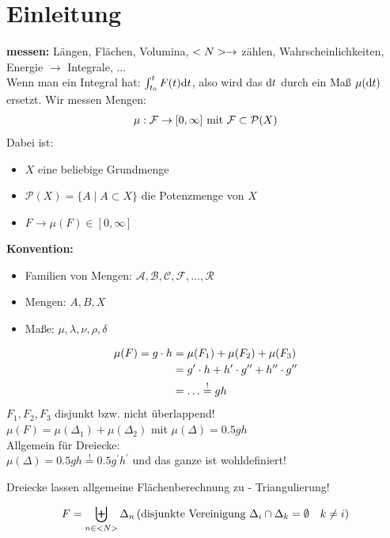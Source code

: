 \section{Einleitung}

\textbf{messen:} Längen, Flächen, Volumina, $<N> \to $ zählen, Wahrscheinlichkeiten, Energie $\to$ Integrale, ... \\
Wenn man ein Integral hat: $\int_{t_0}^{t}F(t)\mathrm{d} t$, also wird das $\mathrm{d} t$ durch ein Maß $\mu(\mathrm{d} t)$ ersetzt.
\newline Wir messen Mengen:
\begin{align}
	\mu: \mathcal{F} \to [0,\infty] \text{ mit }\mathcal{F} \subset \mathcal{P}(X) \notag
\end{align}
Dabei ist:
\begin{itemize}
	\item $X$ eine beliebige Grundmenge
	\item $\mathcal{P}(X)=\{A\mid A\subset X\}$ die Potenzmenge von $X$
	\item $F \to \mu(F) \in [0,\infty]$
\end{itemize}

\textbf{Konvention:}
\begin{itemize}
	\item Familien von Mengen: $\mathcal{A}, \mathcal{B}, \mathcal{C}, \mathcal{F}, \dots, \mathcal{R}$
	\item Mengen: $A, B, X$
	\item Maße: $\mu, \lambda, \nu, \rho, \delta$
\end{itemize}

\begin{example}[Flächenmessung]
	\begin{align}
		\mu(F) = g \cdot h &= \mu(F_1) + \mu(F_2) + \mu(F_3)\notag\\
		                   &= g^{\prime} \cdot h + h^{\prime}\cdot g^{\prime \prime} + h^{\prime \prime} \cdot g^{\prime \prime}\notag\\
		                   &= \dots \overset{!}{=} gh\notag
	\end{align}
	$F_1, F_2, F_3$ disjunkt bzw. nicht überlappend!\\
	$\mu(F) = \mu(\Delta_1)+\mu(\Delta_2)$ mit $\mu(\Delta) = 0.5 gh$\\ %
	Allgemein für Dreiecke: \\%
	$\mu(\Delta) = 0.5 gh \overset{!}{=} 0.5 g^{\prime}h^{\prime}$ und das ganze ist wohldefiniert!
\end{example}
Dreiecke lassen allgemeine Flächenberechnung zu - Triangulierung!

\begin{align}
	F = \biguplus_{n\in <N>} \Delta_n\, (\text{disjunkte Vereinigung } \Delta_i \cap \Delta_k = \emptyset \quad k \neq i)\notag
\end{align} %



